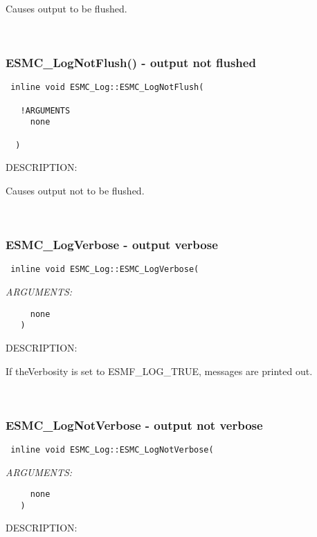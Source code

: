  
   Causes output to be flushed. 
 
\mbox{}\hrulefill\ 
 

                     \subsubsection [ESMC\_LogNotFlush()] {ESMC\_LogNotFlush() - output not flushed}


\begin{verbatim} 	     
 inline void ESMC_Log::ESMC_LogNotFlush(
 				  
   !ARGUMENTS        
     none   
 
  )    
 	     \end{verbatim}
{\sf DESCRIPTION:\\ }


   Causes output not to be flushed. 
 
\mbox{}\hrulefill\ 
 

  \subsubsection [ESMC\_LogVerbose] {ESMC\_LogVerbose - output verbose }


  
\begin{verbatim} 
 inline void ESMC_Log::ESMC_LogVerbose(
 \end{verbatim}{\em ARGUMENTS:}
\begin{verbatim}     none
   )
 \end{verbatim}
{\sf DESCRIPTION:\\ }


   If theVerbosity is set to ESMF\_LOG\_TRUE, messages are printed out. 
    
 
\mbox{}\hrulefill\ 
 

  \subsubsection [ESMC\_LogNotVerbose] {ESMC\_LogNotVerbose - output not verbose }


  
\begin{verbatim} 
 inline void ESMC_Log::ESMC_LogNotVerbose(
 \end{verbatim}{\em ARGUMENTS:}
\begin{verbatim}     none
   )
 \end{verbatim}
{\sf DESCRIPTION:\\ }


